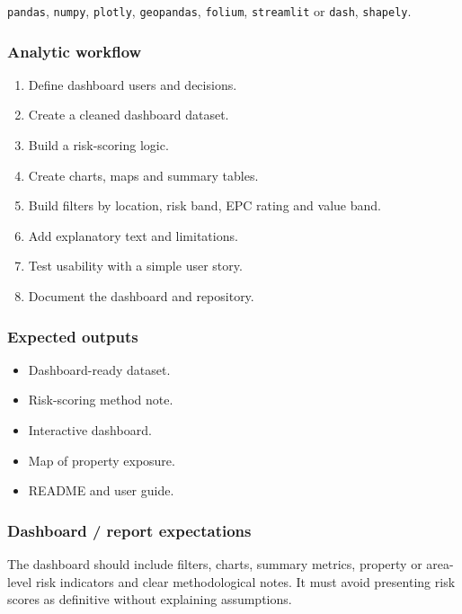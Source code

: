 \documentclass[
  a4paper,
]{article}
\providecommand{\tightlist}{%
  \setlength{\itemsep}{0pt}\setlength{\parskip}{0pt}}
\begin{document}
\texttt{pandas}, \texttt{numpy}, \texttt{plotly}, \texttt{geopandas},
\texttt{folium}, \texttt{streamlit} or \texttt{dash}, \texttt{shapely}.

\subsubsection{Analytic workflow}\label{analytic-workflow-1}

\begin{enumerate}
\def\labelenumi{\arabic{enumi}.}
\tightlist
\item
  Define dashboard users and decisions.
\item
  Create a cleaned dashboard dataset.
\item
  Build a risk-scoring logic.
\item
  Create charts, maps and summary tables.
\item
  Build filters by location, risk band, EPC rating and value band.
\item
  Add explanatory text and limitations.
\item
  Test usability with a simple user story.
\item
  Document the dashboard and repository.
\end{enumerate}

\subsubsection{Expected outputs}\label{expected-outputs-1}

\begin{itemize}
\tightlist
\item
  Dashboard-ready dataset.
\item
  Risk-scoring method note.
\item
  Interactive dashboard.
\item
  Map of property exposure.
\item
  README and user guide.
\end{itemize}

\subsubsection{Dashboard / report
expectations}\label{dashboard-report-expectations-1}

The dashboard should include filters, charts, summary metrics, property
or area-level risk indicators and clear methodological notes. It must
avoid presenting risk scores as definitive without explaining
assumptions.
\end{document}
